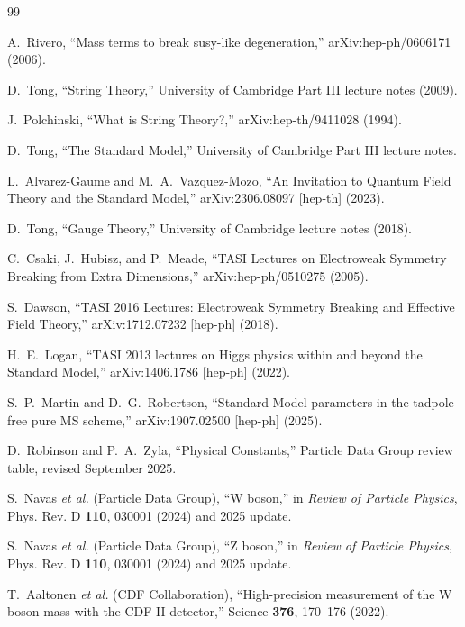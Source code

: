 \begin{thebibliography}{99}

A.~Rivero, ``Mass terms to break susy-like degeneration,'' arXiv:hep-ph/0606171 (2006).

D.~Tong, ``String Theory,'' University of Cambridge Part III lecture notes (2009).

J.~Polchinski, ``What is String Theory?,'' arXiv:hep-th/9411028 (1994).

D.~Tong, ``The Standard Model,'' University of Cambridge Part III lecture notes.

L.~Alvarez-Gaume and M.~A.~Vazquez-Mozo, ``An Invitation to Quantum Field Theory and the Standard Model,'' arXiv:2306.08097 [hep-th] (2023).

D.~Tong, ``Gauge Theory,'' University of Cambridge lecture notes (2018).

C.~Csaki, J.~Hubisz, and P.~Meade, ``TASI Lectures on Electroweak Symmetry Breaking from Extra Dimensions,'' arXiv:hep-ph/0510275 (2005).

S.~Dawson, ``TASI 2016 Lectures: Electroweak Symmetry Breaking and Effective Field Theory,'' arXiv:1712.07232 [hep-ph] (2018).

H.~E.~Logan, ``TASI 2013 lectures on Higgs physics within and beyond the Standard Model,'' arXiv:1406.1786 [hep-ph] (2022).

S.~P.~Martin and D.~G.~Robertson, ``Standard Model parameters in the tadpole-free pure MS scheme,'' arXiv:1907.02500 [hep-ph] (2025).

D.~Robinson and P.~A.~Zyla, ``Physical Constants,'' Particle Data Group review table, revised September 2025.

S.~Navas \textit{et al.} (Particle Data Group), ``W boson,'' in \textit{Review of Particle Physics}, Phys. Rev. D \textbf{110}, 030001 (2024) and 2025 update.

S.~Navas \textit{et al.} (Particle Data Group), ``Z boson,'' in \textit{Review of Particle Physics}, Phys. Rev. D \textbf{110}, 030001 (2024) and 2025 update.

T.~Aaltonen \textit{et al.} (CDF Collaboration), ``High-precision measurement of the W boson mass with the CDF II detector,'' Science \textbf{376}, 170--176 (2022).


\end{thebibliography}
